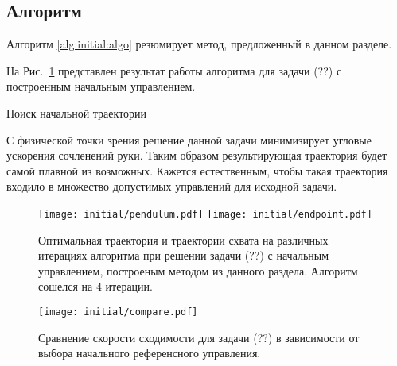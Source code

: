 \documentclass[../../doc.tex]{subfiles}
\begin{document}
    \subsection{Алгоритм}

    Алгоритм \ref{alg:initial:algo} резюмирует метод, предложенный в данном разделе.

    На Рис.~\ref{fig:initial:pendulum} представлен результат работы алгоритма для задачи (??) с построенным начальным управлением.


    \begin{rusalgorithm}\caption{Поиск начальной траектории}\label{alg:initial:algo}
        \DontPrintSemicolon
        
    \end{rusalgorithm}

    \begin{remark}
        С физической точки зрения решение данной задачи минимизирует угловые ускорения сочленений руки.
        Таким образом результирующая траектория будет самой плавной из возможных.
        Кажется естественным, чтобы такая траектория входило в множество допустимых управлений для исходной задачи.
    \end{remark}

    \begin{figure}[h]
        \begin{center}
            \texttt{[image: initial/pendulum.pdf]}
            \texttt{[image: initial/endpoint.pdf]}
        \end{center}
        \caption{
            Оптимальная траектория и траектории схвата на различных итерациях алгоритма при решении задачи (??) с начальным управлением, построеным методом из данного раздела.
            Алгоритм сошелся на $4$ итерации.
        }
        \label{fig:initial:pendulum}
    \end{figure}
    \begin{figure}[h]
        \begin{center}
            \texttt{[image: initial/compare.pdf]}
        \end{center}
        \caption{Сравнение скорости сходимости для задачи (??) в зависимости от выбора начального референсного управления.}
    \end{figure}

    \ifSubfilesClassLoaded{
        \nocite{*}
        \clearpage
        
        
    }{}
\end{document}
